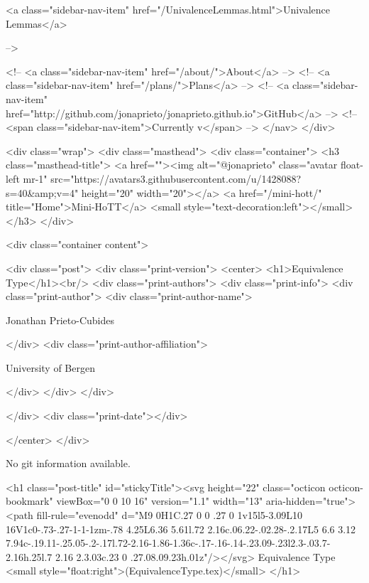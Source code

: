       
    
      
        
          <a class="sidebar-nav-item" href="/UnivalenceLemmas.html">Univalence Lemmas</a>
        
      
     -->

    <!-- <a class="sidebar-nav-item" href="/about/">About</a> -->
    <!-- <a class="sidebar-nav-item" href="/plans/">Plans</a> -->
    <!-- <a class="sidebar-nav-item" href="http://github.com/jonaprieto/jonaprieto.github.io">GitHub</a> -->
    <!-- <span class="sidebar-nav-item">Currently v</span> -->
  </nav>
</div>

    <div class="wrap">
      <div class="masthead">
        <div class="container">
          <h3 class="masthead-title">
            <a href=""><img alt="@jonaprieto" class="avatar float-left mr-1" src="https://avatars3.githubusercontent.com/u/1428088?s=40&amp;v=4" height="20" width="20"></a>
            <a href="/mini-hott/" title="Home">Mini-HoTT</a>
            <small style="text-decoration:left"></small>
          </h3>
        </div>
      
      <div class="container content">
        







<div class="post">
  <div class="print-version">
    <center>
      <h1>Equivalence Type</h1><br/>
        <div class="print-authors">
          <div class="print-info">
            <div class="print-author">
              <div class="print-author-name">
                
                  Jonathan Prieto-Cubides
                
              </div>
              <div class="print-author-affiliation">
                
                  University of Bergen
                
                </div>
            </div>
          </div>
          
          
        </div>
        <div class="print-date"></div>
        
        
    </center>
  </div>

  
  No git information available.
  

  <h1 class="post-title" id="stickyTitle"><svg height="22" class="octicon octicon-bookmark" viewBox="0 0 10 16" version="1.1" width="13" aria-hidden="true"><path fill-rule="evenodd" d="M9 0H1C.27 0 0 .27 0 1v15l5-3.09L10 16V1c0-.73-.27-1-1-1zm-.78 4.25L6.36 5.61l.72 2.16c.06.22-.02.28-.2.17L5 6.6 3.12 7.94c-.19.11-.25.05-.2-.17l.72-2.16-1.86-1.36c-.17-.16-.14-.23.09-.23l2.3-.03.7-2.16h.25l.7 2.16 2.3.03c.23 0 .27.08.09.23h.01z"/></svg> Equivalence Type <small style="float:right">(EquivalenceType.tex)</small>
  </h1>


